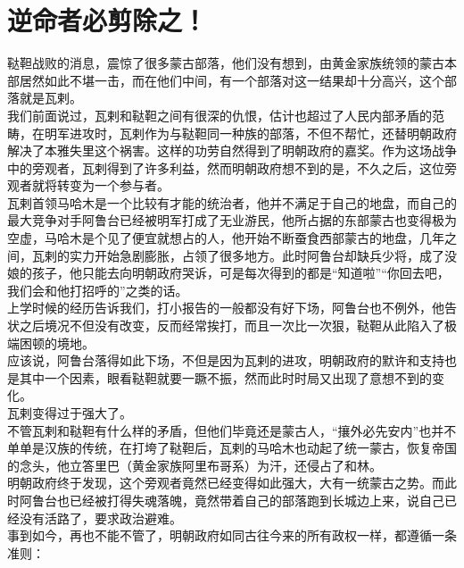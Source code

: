 \section{逆命者必剪除之！}
\ifnum{}
	\begin{multicols}{\theparacolNo}
\fi
鞑靼战败的消息，震惊了很多蒙古部落，他们没有想到，由黄金家族统领的蒙古本部居然如此不堪一击，而在他们中间，有一个部落对这一结果却十分高兴，这个部落就是瓦剌。\\

我们前面说过，瓦剌和鞑靼之间有很深的仇恨，估计也超过了人民内部矛盾的范畴，在明军进攻时，瓦剌作为与鞑靼同一种族的部落，不但不帮忙，还替明朝政府解决了本雅失里这个祸害。这样的功劳自然得到了明朝政府的嘉奖。作为这场战争中的旁观者，瓦剌得到了许多利益，然而明朝政府想不到的是，不久之后，这位旁观者就将转变为一个参与者。\\

瓦剌首领马哈木是一个比较有才能的统治者，他并不满足于自己的地盘，而自己的最大竞争对手阿鲁台已经被明军打成了无业游民，他所占据的东部蒙古也变得极为空虚，马哈木是个见了便宜就想占的人，他开始不断蚕食西部蒙古的地盘，几年之间，瓦剌的实力开始急剧膨胀，占领了很多地方。此时阿鲁台却缺兵少将，成了没娘的孩子，他只能去向明朝政府哭诉，可是每次得到的都是“知道啦”“你回去吧，我们会和他打招呼的”之类的话。\\

上学时候的经历告诉我们，打小报告的一般都没有好下场，阿鲁台也不例外，他告状之后境况不但没有改变，反而经常挨打，而且一次比一次狠，鞑靼从此陷入了极端困顿的境地。\\

应该说，阿鲁台落得如此下场，不但是因为瓦剌的进攻，明朝政府的默许和支持也是其中一个因素，眼看鞑靼就要一蹶不振，然而此时时局又出现了意想不到的变化。\\

瓦剌变得过于强大了。\\

不管瓦剌和鞑靼有什么样的矛盾，但他们毕竟还是蒙古人，“攘外必先安内”也并不单单是汉族的传统，在打垮了鞑靼后，瓦剌的马哈木也动起了统一蒙古，恢复帝国的念头，他立答里巴（黄金家族阿里布哥系）为汗，还侵占了和林。\\

明朝政府终于发现，这个旁观者竟然已经变得如此强大，大有一统蒙古之势。而此时阿鲁台也已经被打得失魂落魄，竟然带着自己的部落跑到长城边上来，说自己已经没有活路了，要求政治避难。\\

事到如今，再也不能不管了，明朝政府如同古往今来的所有政权一样，都遵循一条准则：\\


\end{multicols}

